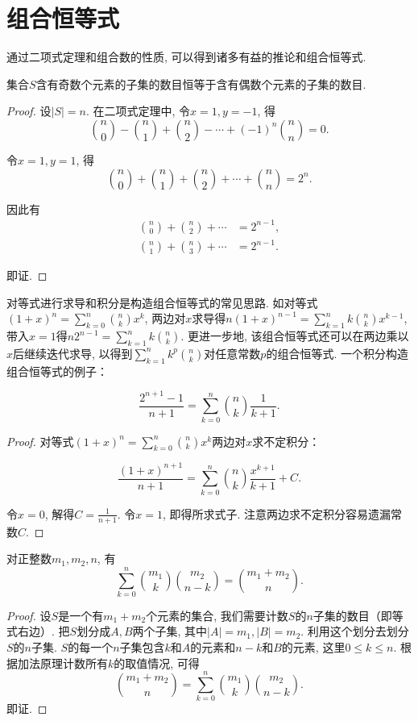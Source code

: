 \section{组合恒等式}
通过二项式定理和组合数的性质, 可以得到诸多有益的推论和组合恒等式.

\begin{corollary}
    \label{exstl1}
    集合\(S\)含有奇数个元素的子集的数目恒等于含有偶数个元素的子集的数目.
\end{corollary}
\begin{proof}
    设\(|S|=n\).   在二项式定理中, 令\(x=1, y=-1\), 得
    \[\binom{n}{0} - \binom{n}{1} + \binom{n}{2} - \cdots + (-1)^n \binom{n}{n} = 0 .  \]

    令\(x=1, y=1\), 得
    \[\binom{n}{0} + \binom{n}{1} + \binom{n}{2} + \cdots + \binom{n}{n} = 2^n.  \]

    因此有
    \begin{align*}
        \binom{n}{0} + \binom{n}{2} + \cdots & = 2^{n-1}, \\
        \binom{n}{1} + \binom{n}{3} + \cdots & = 2^{n-1}.
    \end{align*}

    即证.
\end{proof}

对等式进行求导和积分是构造组合恒等式的常见思路.  如对等式\((1 + x)^n = \sum_{k=0}^{n} \binom{n}{k} x^k\), 两边对\(x\)求导得\(n(1 + x)^{n-1} = \sum_{k=1}^{n} k \binom{n}{k} x^{k-1}\), 带入\(x=1\)得\(n 2^{n-1} = \sum_{k=1}^{n} k \binom{n}{k}\).  更进一步地, 该组合恒等式还可以在两边乘以\(x\)后继续迭代求导, 以得到\(\sum_{k=1}^{n} k^p \binom{n}{k}\)对任意常数\(p\)的组合恒等式.  一个积分构造组合恒等式的例子：

\begin{corollary}
    $$\frac{2^{n+1}-1}{n+1} = \sum_{k=0}^{n} \binom{n}{k} \frac{1}{k+1}.  $$
\end{corollary}
\begin{proof}
    对等式\((1 + x)^n = \sum_{k=0}^{n} \binom{n}{k} x^k\)两边对\(x\)求不定积分：

    \[\frac{(1+x)^{n+1}}{n+1} = \sum_{k=0}^{n} \binom{n}{k} \frac{x^{k+1}}{k+1} + C.  \]

    令\(x=0\), 解得\(C=\frac{1}{n+1}\).   令\(x=1\), 即得所求式子.  注意两边求不定积分容易遗漏常数\(C\).
\end{proof}

\begin{corollary}[范德蒙卷积公式]
    对正整数\(m_1,  m_2,  n\), 有
    \[\sum_{k=0}^{n} \binom{m_1}{k} \binom{m_2}{n-k} = \binom{m_1+m_2}{n}.  \]
\end{corollary}
\begin{proof}
    设\(S\)是一个有\(m_1+m_2\)个元素的集合, 我们需要计数\(S\)的\(n\)子集的数目（即等式右边）.  把\(S\)划分成\(A, B\)两个子集, 其中\(|A|=m_1, |B|=m_2\).  利用这个划分去划分\(S\)的\(n\)子集.  \(S\)的每一个\(n\)子集包含\(k\)和\(A\)的元素和\(n-k\)和\(B\)的元素, 这里\(0\leq k \leq n\).  根据加法原理计数所有\(k\)的取值情况, 可得
    \[\binom{m_1+m_2}{n}=\sum_{k=0}^{n} \binom{m_1}{k} \binom{m_2}{n-k} .  \]
    即证.
\end{proof}

